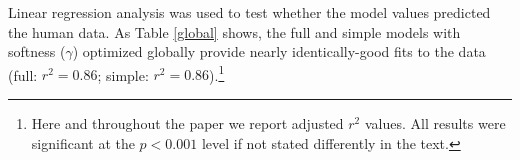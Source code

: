 \documentclass[11pt,a4paper]{article}
\begin{document}
Linear regression analysis was used to test whether the model values predicted the human data. 
As Table \ref{global} shows, the full and simple models with softness ($\gamma$) optimized globally provide nearly identically-good fits to the data (full: $r^2 = 0.86$; simple: $r^2 =  0.86$).\footnote{Here and throughout the paper we report adjusted $r^2$ values. All results were significant at the $p < 0.001$ level if not stated differently in the text.}
\end{document}

